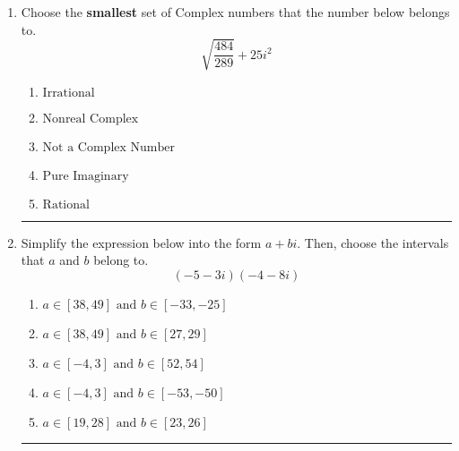 \documentclass[14pt]{extbook}
\newcommand{\litem}[1]{\item#1\hspace*{-1cm}\rule{\textwidth}{0.4pt}}
\begin{document}
\begin{enumerate}
{\begin{enumerate}[label=\Alph*.]
\end{enumerate} }
\litem{
Choose the \textbf{smallest} set of Complex numbers that the number below belongs to.\[ \sqrt{\frac{484}{289}} + 25i^2 \]\begin{enumerate}[label=\Alph*.]
\item \( \text{Irrational} \)
\item \( \text{Nonreal Complex} \)
\item \( \text{Not a Complex Number} \)
\item \( \text{Pure Imaginary} \)
\item \( \text{Rational} \)

\end{enumerate} }
\litem{
Simplify the expression below into the form $a+bi$. Then, choose the intervals that $a$ and $b$ belong to.\[ (-5 - 3 i)(-4 - 8 i) \]\begin{enumerate}[label=\Alph*.]
\item \( a \in [38, 49] \text{ and } b \in [-33, -25] \)
\item \( a \in [38, 49] \text{ and } b \in [27, 29] \)
\item \( a \in [-4, 3] \text{ and } b \in [52, 54] \)
\item \( a \in [-4, 3] \text{ and } b \in [-53, -50] \)
\item \( a \in [19, 28] \text{ and } b \in [23, 26] \)

\end{enumerate} }
\end{enumerate}
\end{document}
